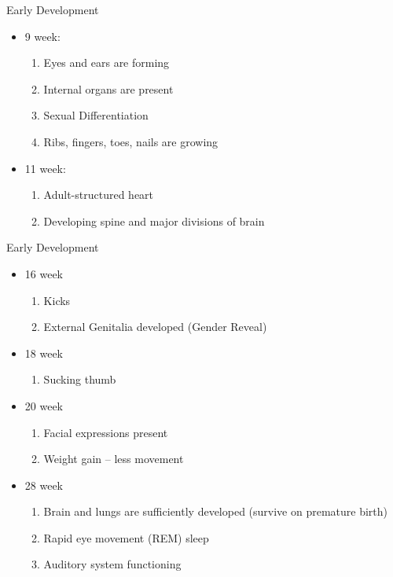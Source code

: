 \documentclass{beamer} %
\begin{document}
\begin{frame}{Early Development}
\begin{itemize}
    \item 9 week:
    \begin{enumerate}
        \item Eyes and ears are forming
        \item Internal organs are present
        \item Sexual Differentiation
        \item Ribs, fingers, toes, nails are growing
    \end{enumerate}
    \pause
    \item 11 week:
    \begin{enumerate}
        \item Adult-structured heart
        \item Developing spine and major divisions of brain
    \end{enumerate}
\end{itemize}

\end{frame}
\begin{frame}{Early Development}
\begin{itemize}
    \item 16 week
    \begin{enumerate}
        \item Kicks
        \item External Genitalia developed (Gender Reveal)
        \end{enumerate}
    \pause
    \item 18 week
    \begin{enumerate}
        \item Sucking thumb
    \end{enumerate}
    \pause
    \item 20 week
    \begin{enumerate}
        \item Facial expressions present
        \item Weight gain -- less movement
    \end{enumerate}
    \pause
     \item 28 week
    \begin{enumerate}
        \item Brain and lungs are sufficiently developed (survive on premature birth)
        \item Rapid eye movement (REM) sleep
        \item Auditory system functioning
    \end{enumerate}
\end{itemize}
\end{frame}
\end{document}
